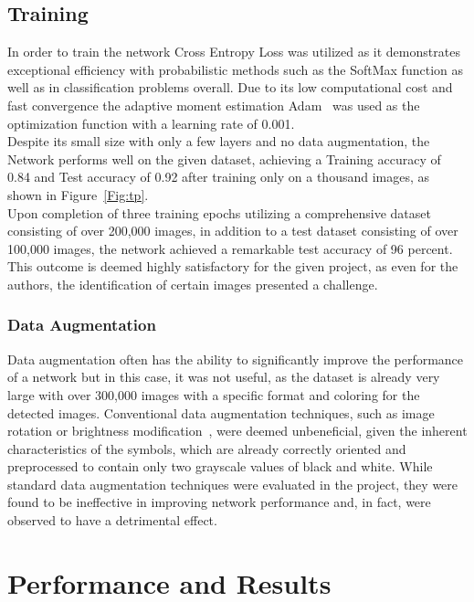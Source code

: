 \documentclass[@CLASSOPTIONS@]{tumarticle}
\begin{document}
\subsection{Training}

In order to train the network Cross Entropy Loss was utilized as it demonstrates exceptional efficiency with probabilistic
methods such as the SoftMax function as well as in classification problems overall.
Due to its low computational cost and fast convergence the adaptive moment estimation Adam~\cite{Adam} was used as the optimization
function with a learning rate of 0.001.\\
Despite its small size with only a few layers and no data augmentation, the Network performs well on the given dataset,
achieving a Training accuracy of 0.84 and Test accuracy of 0.92 after training only on a thousand images, as shown in
Figure~\ref{Fig:tp}.\\
Upon completion of three training epochs utilizing a comprehensive dataset consisting of over 200,000 images, in
addition to a test dataset consisting of over 100,000 images, the network achieved a remarkable test accuracy of 96 percent.
This outcome is deemed highly satisfactory for the given project, as even for the authors, the identification of certain
images presented a challenge.\\

\subsubsection{Data Augmentation}
Data augmentation often has the ability to significantly improve the performance of a network but in this case, it
was not useful, as the dataset is already very large with over 300,000 images with a specific format and coloring for
the detected images.
Conventional data augmentation techniques, such as image rotation or brightness modification~\cite{DataAugm},
were deemed unbeneficial, given the inherent characteristics of the symbols, which are already correctly
oriented and preprocessed to contain only two grayscale values of black and white.
While standard data augmentation techniques were evaluated in the project, they were found to be ineffective in
improving network performance and, in fact, were observed to have a detrimental effect.

\section{Performance and Results}
\label{sec:customization}
\end{document}
